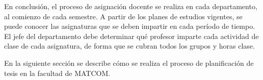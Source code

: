 En conclusión, el proceso de asignación docente se realiza en cada departamento, al comienzo de cada semestre. 
A partir de los planes de estudios vigentes, 
se puede conocer las asignaturas que se deben impartir 
en cada período de tiempo.
El jefe del departamento debe determinar qué profesor imparte cada actividad de clase de cada asignatura, 
de forma que se cubran todos los grupos y horas clase.

En la siguiente sección se describe cómo se realiza el proceso de planificación 
de tesis en la facultad de MATCOM.









